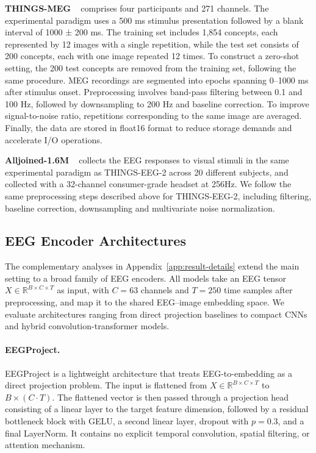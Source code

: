 \documentclass{article}
\begin{document}
 \textbf{THINGS-MEG} ~\cite{hebart2025thingsmeg} comprises four participants and 271 channels. The experimental paradigm uses a 500 ms stimulus presentation followed by a blank interval of 1000 ± 200 ms. The training set includes 1,854 concepts, each represented by 12 images with a single repetition, while the test set consists of 200 concepts, each with one image repeated 12 times. To construct a zero-shot setting, the 200 test concepts are removed from the training set, following the same procedure. MEG recordings are segmented into epochs spanning 0–1000 ms after stimulus onset. Preprocessing involves band-pass filtering between 0.1 and 100 Hz, followed by downsampling to 200 Hz and baseline correction. To improve signal-to-noise ratio, repetitions corresponding to the same image are averaged. Finally, the data are stored in float16 format to reduce storage demands and accelerate I/O operations.

\textbf{Alljoined-1.6M} ~\cite{xu2025alljoined} collects the EEG responses to visual stimuli in the same experimental paradigm as THINGS-EEG-2 across 20 different subjects, and collected with a  32-channel consumer-grade headset at 256Hz. We follow the same preprocessing steps described above for THINGS-EEG-2, including filtering, baseline correction, downsampling and multivariate noise normalization.

\subsection{EEG Encoder Architectures}
\label{app:encoder-details}

The complementary analyses in Appendix~\ref{app:result-details} extend the main setting to a broad family of EEG encoders. All models take an EEG tensor $X \in \mathbb{R}^{B \times C \times T}$ as input, with $C=63$ channels and $T=250$ time samples after preprocessing, and map it to the shared EEG--image embedding space. We evaluate architectures ranging from direct projection baselines to compact CNNs and hybrid convolution-transformer models.

\paragraph{EEGProject.}
EEGProject is a lightweight architecture that treats EEG-to-embedding as a direct projection problem. The input is flattened from $X \in \mathbb{R}^{B \times C \times T}$ to $B \times (C \cdot T)$. The flattened vector is then passed through a projection head consisting of a linear layer to the target feature dimension, followed by a residual bottleneck block with GELU, a second linear layer, dropout with $p=0.3$, and a final LayerNorm. It contains no explicit temporal convolution, spatial filtering, or attention mechanism.
\end{document}
